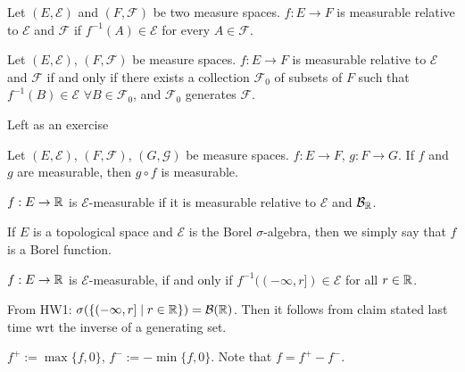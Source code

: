 \documentclass[12pt, titlepage]{article}
\begin{document}
\begin{dfn}{}
	Let $(E, \mathcal{E})$ and $(F, \mathcal{F})$ be two measure spaces. $f: E \to F$ is measurable relative to $\mathcal{E}$ and $\mathcal{F}$ if $f^{-1}(A) \in \mathcal{E}$ for every $A \in \mathcal{F}$.
\end{dfn}

\begin{theo}[]{}
	Let $(E, \mathcal{E})$, $(F, \mathcal{F})$ be measure spaces. $f: E \to F$ is measurable relative to $\mathcal{E}$ and $\mathcal{F}$ if and only if there exists a collection $\mathcal{F}_0$ of subsets of $F$ such that $f^{-1}(B) \in \mathcal{E}$ $\forall B \in \mathcal{F_0}$, and $\mathcal{F}_0$ generates $\mathcal{F}$.
\end{theo}

\begin{prf}[]{}
	Left as an exercise
\end{prf}

\begin{theo}[]{}
	Let $(E, \mathcal{E})$, $(F, \mathcal{F})$, $(G, \mathcal{G})$ be measure spaces. $f: E \to F$, $g: F \to G$. If $f$ and $g$ are measurable, then $g \circ f$ is measurable.
\end{theo}

\begin{dfn}[]{}
	$f: E \to \mathbb{R}$ is $\mathcal{E}$-measurable if it is measurable relative to $\mathcal{E}$ and $\mathcal{B}_{\mathbb{R}}$.\\
\end{dfn}

\begin{dfn}{}
	If $E$ is a topological space and $\mathcal{E}$ is the Borel $\sigma$-algebra, then we simply say that $f$ is a Borel function.
\end{dfn}

\begin{lem}[]{}
	$f: E \to \mathbb{R}$ is $\mathcal{E}$-measurable, if and only if $f^{-1}((-\infty, r]) \in \mathcal{E}$ for all $r \in \mathbb{R}$.\\
\end{lem}

\begin{prf}
	From HW1: $\sigma(\{(-\infty, r] \mid r \in \mathbb{R}\}) = \mathcal{B}(\mathbb{R})$. Then it follows from claim stated last time wrt the inverse of a generating set.\\
\end{prf}

\begin{dfn}[]{}
	$f^+:= \max\{f, 0\}$, $f^-:= -\min\{f, 0\}$. Note that $f = f^+ - f^-$.\\
\end{dfn}
\end{document}
